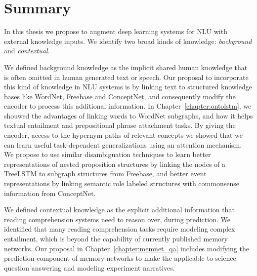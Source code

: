\section{Summary}
In this thesis we propose to augment deep learning systems for NLU with external knowledge inputs. We identify two broad kinds of knowledge: \textit{background} and \textit{contextual}.

We defined background knowledge as the implicit shared human knowledge that is often omitted in human generated text or speech. Our proposal to incorporate this kind of knowledge in NLU systems is by linking text to structured knowledge bases like
WordNet, Freebase and ConceptNet, and consequently modify the encoder to process this additional information. In Chapter~\ref{chapter:ontolstm}, we shouwed the advantages of linking words to WordNet subgraphs, and how it helps textual entailment and 
prepositional phrase attachment tasks. By giving the encoder, access to the hypernym paths of relevant concepts we showed that we can learn useful task-dependent generalizations using an attention mechanism. We propose to use similar disambiguation
techniques to learn better representations of nested proposition structures by linking the nodes of a TreeLSTM to subgraph structures from Freebase, and better event representations by linking semantic role labeled structures with commonsense information from ConceptNet.

We defined contextual knowledge as the explicit additional information that reading comprehension systems need to reason over, during prediction. We identified that many reading comprehension tasks require modeling complex entailment,
which is beyond the capability of currently published memory networks. Our proposal in Chapter~\ref{chapter:memnet_qa} includes modifying the prediction component of memory networks to make the applicable to science question answering and modeling experiment narratives.

